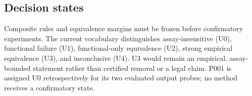 \subsection{Decision states}
Composite rules and equivalence margins must be frozen before confirmatory experiments.
The current vocabulary distinguishes assay-insensitive (U0), functional failure (U1),
functional-only equivalence (U2), strong empirical equivalence (U3), and inconclusive
(U4). U3 would remain an empirical, assay-bounded statement rather than certified removal
or a legal claim. P001 is assigned U0 retrospectively for its two evaluated output probes;
no method receives a confirmatory state.
